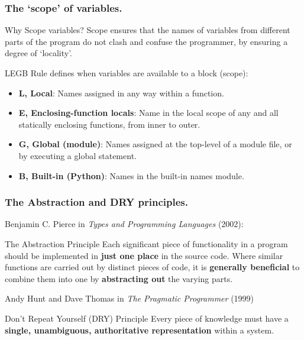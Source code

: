 \documentclass{beamer} %
\newcommand\emc[1]{\textcolor{brightblue}{\textbf{#1}}}
\begin{document}
\begin{frame}
\frametitle{The `scope' of variables.}

\begin{block}{Why Scope variables?}
Scope ensures that the names of variables from different parts of the program do not clash and 
confuse the programmer, by ensuring a degree of `locality'. 
\end{block}

LEGB Rule defines when variables are available to a block (scope):
\begin{itemize}
\item \emc{L, Local}: Names assigned in any way within a function.
\item \emc{E, Enclosing-function locals}: Name in the local scope of any and all statically enclosing functions, from inner to outer.
\item \emc{G, Global (module)}: Names assigned at the top-level of a module file, or by executing a global statement.
\item \emc{B, Built-in (Python)}: Names in the built-in names module.
\end{itemize}
\end{frame}

\begin{frame}
\frametitle{The Abstraction and DRY principles.}

Benjamin C. Pierce in \emph{Types and Programming Languages} (2002):
\begin{block}{The Abstraction Principle}
Each significant piece of functionality in a program should be implemented in \emc{just one place} in the source code. Where similar functions are carried out by distinct pieces of code, it is \emc{generally beneficial} to combine them into one by \emc{abstracting out} the varying parts.
\end{block}

 Andy Hunt and Dave Thomas in \emph{The Pragmatic Programmer} (1999)
\begin{block}{Don't Repeat Yourself (DRY) Principle}
Every piece of knowledge must have a \emc{single, unambiguous, authoritative representation} within a system.
\end{block}

\end{frame}

\end{document}
